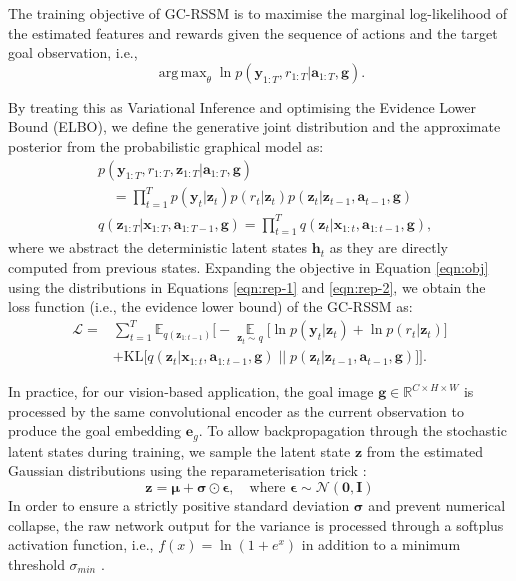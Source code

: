 \documentclass[journal]{IEEEtran}
\DeclareMathOperator{\E}{\mathbb{E}}
\DeclareMathOperator*{\argmax}{arg\,max}
\newcommand{\addinfo}[1]{\textcolor{myPurple}{#1}}
\begin{document}
The training objective of GC-RSSM is to maximise the marginal log-likelihood of the estimated features and rewards given the sequence of actions and the target goal observation, i.e.,
\begin{equation}
    \argmax_{\theta} \ln p(\bm{y}_{1:T}, r_{1:T} | \bm{a}_{1:T}, \bm{g}). \label{eqn:obj}
\end{equation}

By treating this as Variational Inference and optimising the Evidence Lower Bound (ELBO), we define the generative joint distribution and the approximate posterior from the probabilistic graphical model as:
\begin{align}
    &p(\bm{y}_{1:T}, r_{1:T}, \bm{z}_{1:T} | \bm{a}_{1:T}, \bm{g}) \nonumber \\
    &\quad = \prod_{t=1}^T p(\bm{y}_t|\bm{z}_t) p(r_t|\bm{z}_t) p(\bm{z}_t|\bm{z}_{t-1}, \bm{a}_{t-1}, \bm{g}) \label{eqn:rep-1}\\
    &q(\bm{z}_{1:T}| \bm{x}_{1:T}, \bm{a}_{1:T-1}, \bm{g}) = \prod_{t=1}^T q(\bm{z}_t| \bm{x}_{1:t}, \bm{a}_{1:t-1}, \bm{g}) \label{eqn:rep-2},
\end{align}
where we abstract the deterministic latent states $\bm{h}_t$ as they are directly computed from previous states. Expanding the objective in Equation \ref{eqn:obj} using the distributions in Equations \ref{eqn:rep-1} and \ref{eqn:rep-2}, we obtain the loss function (i.e., the evidence lower bound) of the GC-RSSM as:
\begin{align}
    \mathcal{L} =& \sum_{t=1}^{T} \mathbb{E}_{q(\bm{z}_{1:t-1})} \Bigg[ - 
     \underset{\bm{z}_t \sim q}{\E} \Big[ \ln p(\bm{y}_t|\bm{z}_t) + \ln p(r_t|\bm{z}_t) \Big] \nonumber\\
    &+ \text{KL}\Big[ q(\bm{z}_t|\bm{x}_{1:t}, \bm{a}_{1:{t-1}}, \bm{g}) \;\Big|\Big|\; p(\bm{z}_{t}|\bm{z}_{t-1}, \bm{a}_{t-1}, \bm{g}) \Big]
     \Bigg] \label{eqn:planet-objective-1}.
\end{align}

\addinfo{In practice, for our vision-based application, the goal image $\bm{g} \in \mathbb{R}^{C\times H\times W}$ is processed by the same convolutional encoder as the current observation to produce the goal embedding $\bm{e}_g$. To allow backpropagation through the stochastic latent states during training, we sample the latent state $\bm{z}$ from the estimated Gaussian distributions using the reparameterisation trick \cite{kingma2013auto}:
\begin{equation}
    \bm{z} = \bm{\mu} + \bm{\sigma} \odot \bm{\epsilon}, \quad \text{where } \bm{\epsilon} \sim \mathcal{N}(\bm{0}, \bm{I}) \label{eqn:reparam}
\end{equation}
In order to ensure a strictly positive standard deviation $\bm{\sigma}$ and prevent numerical collapse, the raw network output for the variance is processed through a softplus activation function, i.e., $f(x)=\ln(1+e^x)$ in addition to a minimum threshold $\sigma_{min}$ \cite{glorot2011deep}.}
\end{document}
